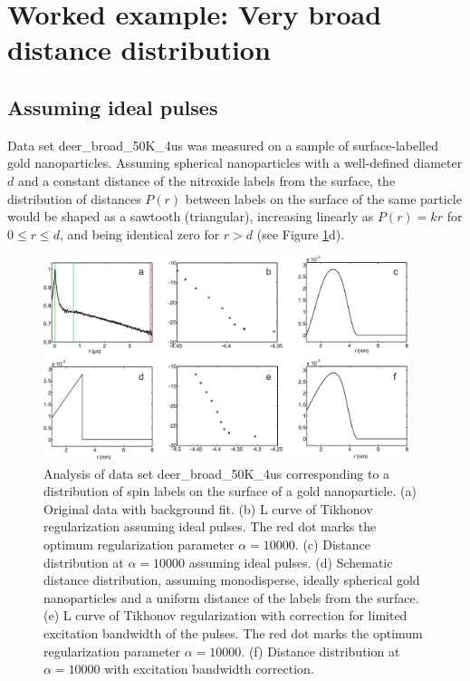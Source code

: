\documentclass[11pt,a4paper]{article}
\begin{document}
\section{Worked example: Very broad distance distribution}

\subsection{Assuming ideal pulses}
Data set {\ttfamily deer\_broad\_50K\_4us} was measured on a sample of surface-labelled gold nanoparticles. Assuming spherical nanoparticles with a well-defined diameter $d$ and a constant distance of the nitroxide labels from the surface, the distribution of distances $P(r)$ between labels on the surface of the same particle would be shaped as a sawtooth (triangular), increasing linearly as $P(r)= k r$ for $0 \leq r \leq d$, and being identical zero for $r > d$ (see Figure \ref{fig:9}d).

\begin{figure}[ht]
 \vspace{10mm}
 	\begin{center}
		\includegraphics[width=0.95\textwidth]{figure9.pdf}
	\end{center}
	\caption{Analysis of data set {\ttfamily deer\_broad\_50K\_4us} corresponding to a distribution of spin labels on the surface of a gold nanoparticle. (a) Original data with background fit. (b) L curve of Tikhonov regularization assuming ideal pulses. The red dot marks the optimum regularization parameter $\alpha = 10000$. (c) Distance distribution at $\alpha = 10000$ assuming ideal pulses. (d) Schematic distance distribution, assuming monodisperse, ideally spherical gold nanoparticles and a uniform distance of the labels from the surface. (e) L curve of Tikhonov regularization with correction for limited excitation bandwidth of the pulses. The red dot marks the optimum regularization parameter $\alpha = 10000$. (f) Distance distribution at $\alpha = 10000$ with excitation bandwidth correction.}
	\label{fig:9}
\end{figure}
\end{document}
